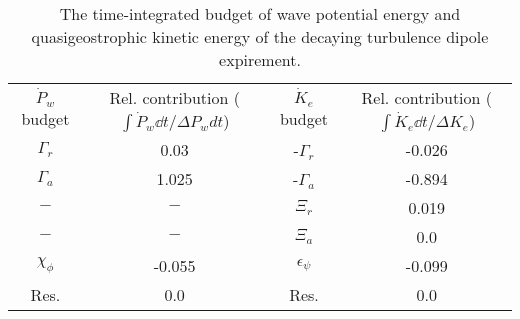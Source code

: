 \begin{table}
\begin{center}
\caption{The time-integrated budget of wave potential energy and quasigeostrophic                kinetic energy of the decaying turbulence dipole expirement. \label{table2}}
\begin{tabular}{cccc}
$\dot{P}_w$ budget & Rel. contribution ($\int\dot{P}_w \dd t/\Delta P_w dt$) & $\dot{K}_e$ budget & Rel. contribution ($\int\dot{K}_e \dd t/\Delta K_e$) \\
$\Gamma_r$ & 0.03 & -$\Gamma_r$ & -0.026 \\
$\Gamma_a$ & 1.025 & -$\Gamma_a$ & -0.894 \\
$-$ & $-$ & $\Xi_r$ & 0.019 \\
$-$ & $-$ & $\Xi_a$ & 0.0 \\
$\chi_\phi$ & -0.055 & $\epsilon_\psi$ & -0.099 \\
Res. & 0.0 & Res. & 0.0 \\
\end{tabular}
\end{center}
\end{table}
